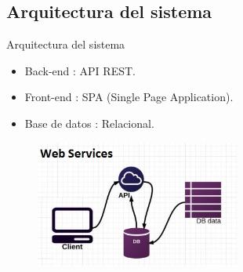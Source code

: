 \documentclass{beamer}
\begin{document}
\subsection{Arquitectura del sistema}

	\begin{frame}{Arquitectura del sistema}
		\begin{itemize}
			\item {
				Back-end : API REST.
				
			}
			\item {
				Front-end : SPA (Single Page Application).
			}
			\item {
				Base de datos : Relacional.
				
			}
		\end{itemize}
		
		
		\begin{figure}[h]
    		\centering
    		\includegraphics[width=0.6\textwidth, height=0.4\textheight]{images_latex/rest-api}

		\end{figure}
	
	\end{frame}
\end{document}
